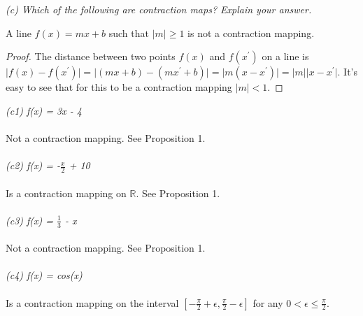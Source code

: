 \documentclass[12pt]{article}
\newenvironment{proposition}[2][Proposition]{\begin{trivlist}
 		\item[\hskip \labelsep {\bfseries #1}\hskip \labelsep {\bfseries #2.}]}{\end{trivlist}}
\theoremstyle{remark}
\begin{document}
 	\vspace{1cm}
 	\noindent \textit{(c) Which of the following are contraction maps? Explain your answer.} 
 	\begin{proposition}{1}
 		A line $f(x) = mx +b$ such that $\vert m \vert \geq 1$ is not a contraction mapping.
 	\end{proposition}
 	\begin{proof}
 		The distance between two points $f(x)$ and $f(x^{\prime})$ on a line is $\vert f(x) - f(x^\prime) \vert = \vert (mx + b) - (mx^\prime + b) \vert = \vert m(x - x^\prime) \vert = \vert m \vert \vert x - x^\prime \vert$. It's easy to see that for this to be a contraction mapping $\vert m \vert < 1$.
 	\end{proof}
 	\noindent \textit{(c1) f(x) = 3x - 4} \\ \\
 	Not a contraction mapping. See Proposition 1. \\ \\
 	\noindent \textit{(c2) f(x) = -$\frac{x}{2}$ + 10} \\ \\
 	Is a contraction mapping on $\mathbb{R}$. See Proposition 1. \\ \\
 	\noindent \textit{(c3) f(x) = $\frac{1}{3}$ - x} \\ \\
 	Not a contraction mapping. See Proposition 1. \\ \\
 	\noindent \textit{(c4) f(x) = cos(x)} \\ \\
 	Is a contraction mapping on the interval $[-\frac{\pi}{2} + \epsilon, \frac{\pi}{2} - \epsilon]$ for any $0 < \epsilon \leq \frac{\pi}{2}$.
\end{document}

